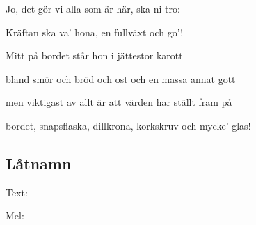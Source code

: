 Jo, det gör vi alla som är här, ska ni tro:

Kräftan ska va’ hona, en fullväxt och go’!

Mitt på bordet står hon i jättestor karott

bland smör och bröd och ost och en massa annat gott

men viktigast av allt är att värden har ställt fram på

bordet, snapsflaska, dillkrona, korkskruv och mycke’ glas!

\subsection{\textbf{Låtnamn}}

Text: 

Mel: \bigskip

\newpage
